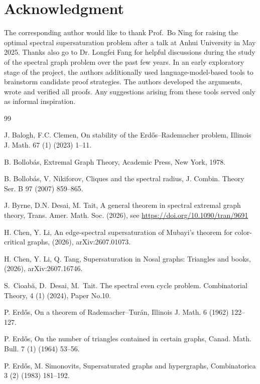 \documentclass[11pt,a4paper]{article}
\theoremstyle{definition}
\theoremstyle{plain}
\begin{document}
\section*{Acknowledgment} 
The corresponding author would like to thank Prof.~Bo Ning for raising the optimal spectral supersaturation problem after a talk at Anhui University in May 2025. 
Thanks also go to Dr. Longfei Fang for helpful discussions during the study of the spectral graph problem over the past few years.
In an early exploratory stage of the project, 
the authors additionally used language-model-based tools to brainstorm candidate proof strategies. 
The authors developed the arguments, wrote and verified all proofs.  
Any suggestions arising from these tools served only as informal inspiration. 



\begin{thebibliography}{99}


 J. Balogh, F.C. Clemen, 
 On stability of the Erd\H{o}s--Rademacher problem, 
 Illinois J. Math. 67 (1) (2023) 1--11. 

B. Bollob\'as, 
Extremal Graph Theory, 
Academic Press, New York, 1978. 

B. Bollob\'{a}s, V. Nikiforov, 
Cliques and the spectral radius, 
J. Combin. Theory Ser. B {97} (2007) 859--865.  

J. Byrne, D.N. Desai, M. Tait, 
A general theorem in spectral extremal graph theory,  
Trans. Amer. Math. Soc. (2026), see \url{https://doi.org/10.1090/tran/9691}

H. Chen, Y. Li,  An edge-spectral supersaturation of Mubayi's theorem for color-critical graphs, (2026), arXiv:2607.01073. 


H. Chen, Y. Li, Q. Tang,  Supersaturation in Nosal graphs: Triangles and books,  (2026), arXiv:2607.16746. 

S.~Cioab\u{a}, D.~Desai, M.~Tait.
The spectral even cycle problem.
{Combinatorial Theory}, 4 (1) (2024), Paper No.10.


P. Erd\H{o}s,
On a theorem of Rademacher--Tur\'{a}n,
Illinois J. Math. 6 (1962) 122--127. 


P. Erd\H{o}s,  
On the number of triangles contained in certain graphs, 
Canad. Math. Bull. 7 (1) (1964) 53--56.  

P. Erd\H{o}s, M. Simonovits,
Supersaturated graphs and hypergraphs,
Combinatorica 3 (2) (1983) 181--192.


\end{thebibliography}
\end{document}
